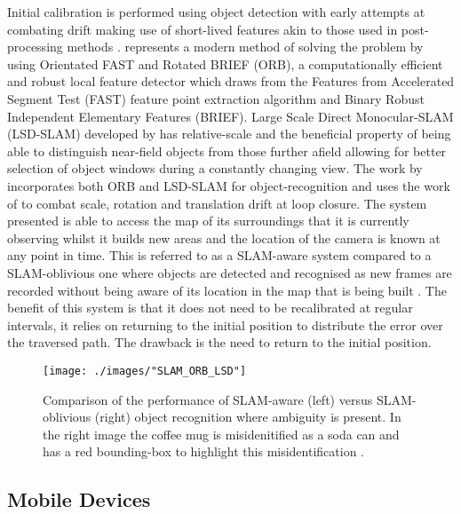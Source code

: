 Initial calibration is performed using object detection with early attempts at combating drift making use of short-lived features akin to those used in post-processing methods \citep{harris_geometry_1992,beardsley_active_1995,ayache_artificial_1991}. \citet{mur-artal_orb-slam:_2015} represents a modern method of solving the problem by using Orientated FAST and Rotated BRIEF (ORB), a computationally efficient and robust local feature detector which draws from the Features from Accelerated Segment Test (FAST) feature point extraction algorithm and Binary Robust Independent Elementary Features (BRIEF). Large Scale Direct Monocular-SLAM (LSD-SLAM) developed by \citet{engel_lsd-slam:_2014} has relative-scale and the beneficial property of being able to distinguish near-field objects from those further afield allowing for better selection of object windows during a constantly changing view. The work by \citet{pillai_monocular_2015} incorporates both ORB and LSD-SLAM for object-recognition and uses the work of \citet{strasdat_scale_2010} to combat scale, rotation and translation drift at loop closure. The system presented is able to access the map of its surroundings that it is currently observing whilst it builds new areas and the location of the camera is known at any point in time. This is referred to as a SLAM-aware system compared to a SLAM-oblivious one where objects are detected and recognised as new frames are recorded without being aware of its location in the map that is being built \citep{pillai_monocular_2015}. The benefit of this system is that it does not need to be recalibrated at regular intervals, it relies on returning to the initial position to distribute the error over the traversed path. The drawback is the need to return to the initial position.
\vspace{10mm}
\begin{figure}[ht!]
	\centering
	\texttt{[image: ./images/"SLAM\_ORB\_LSD"]}
	\caption[Comparison of SLAM-aware and SLAM-oblivious]{Comparison of the performance of SLAM-aware (left) versus SLAM-oblivious (right)
		object recognition where ambiguity is present. In the right image the coffee mug is misidenitified as a soda can and has a red bounding-box to highlight this misidentification \citep{pillai_monocular_2015}.
		\label{SLAM_ORB_LSD}}
\end{figure}

\subsection{Mobile Devices}

